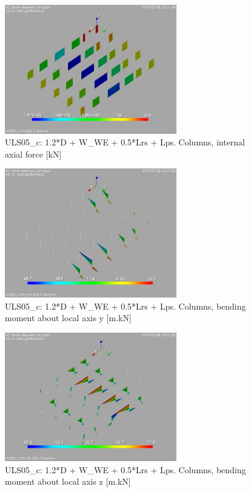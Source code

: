 \begin{figure}
\begin{center}
\includegraphics[width=75mm]{annex_res_columns/graphics/resSimplLC/ULS05_ccolumnsN}
\caption{ULS05\_c: 1.2*D + W\_WE + 0.5*Lrs + Lps. Columns, internal axial force [kN]}
\end{center}
\end{figure}
\begin{figure}
\begin{center}
\includegraphics[width=75mm]{annex_res_columns/graphics/resSimplLC/ULS05_ccolumnsMy}
\caption{ULS05\_c: 1.2*D + W\_WE + 0.5*Lrs + Lps. Columns, bending moment about local axis y [m.kN]}
\end{center}
\end{figure}
\begin{figure}
\begin{center}
\includegraphics[width=75mm]{annex_res_columns/graphics/resSimplLC/ULS05_ccolumnsMz}
\caption{ULS05\_c: 1.2*D + W\_WE + 0.5*Lrs + Lps. Columns, bending moment about local axis z [m.kN]}
\end{center}
\end{figure}
